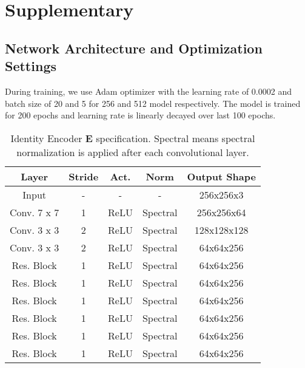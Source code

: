 \documentclass[final]{cvpr}
\begin{document}
\clearpage
{\small


}

\clearpage

\section{Supplementary}
\subsection{Network Architecture and Optimization Settings}


During training, we use Adam optimizer with the learning rate of 0.0002 and batch size of 20 and 5 for 256 and 512 model respectively. The model is trained for 200 epochs and learning rate is linearly decayed over last 100 epochs.
\begin{table}[h]
  \centering
  \begin{tabular}{ccccc}
    \toprule
    Layer & Stride & Act. & Norm & Output Shape \\
    \midrule
    Input & - & - & - & 256x256x3 \\
    \midrule
    Conv. 7 x 7 & 1 & ReLU & Spectral & 256x256x64 \\
    Conv. 3 x 3 & 2 & ReLU & Spectral & 128x128x128 \\
    Conv. 3 x 3 & 2 & ReLU & Spectral & 64x64x256 \\
    \midrule
    Res. Block & 1 & ReLU & Spectral & 64x64x256 \\
    Res. Block & 1 & ReLU & Spectral & 64x64x256 \\
    Res. Block & 1 & ReLU & Spectral & 64x64x256 \\
    Res. Block & 1 & ReLU & Spectral & 64x64x256 \\
    Res. Block & 1 & ReLU & Spectral & 64x64x256 \\
    Res. Block & 1 & ReLU & Spectral & 64x64x256 \\
    \bottomrule
  \end{tabular}
  \caption{Identity Encoder $\mathbf{E}$ specification. Spectral means spectral normalization \cite{miyato2018spectral} is applied after each convolutional layer.}
  
    \label{table:encoder}
\end{table}
\end{document}
